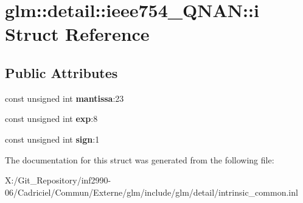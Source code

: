 \hypertarget{structglm_1_1detail_1_1ieee754___q_n_a_n_1_1i}{\section{glm\-:\-:detail\-:\-:ieee754\-\_\-\-Q\-N\-A\-N\-:\-:i Struct Reference}
\label{structglm_1_1detail_1_1ieee754___q_n_a_n_1_1i}
}
\subsection*{Public Attributes}
\begin{DoxyCompactItemize}
\item 
\hypertarget{structglm_1_1detail_1_1ieee754___q_n_a_n_1_1i_a1999926defcba631a716bee7d3044d0a}{const unsigned int {\bfseries mantissa}\-:23}\label{structglm_1_1detail_1_1ieee754___q_n_a_n_1_1i_a1999926defcba631a716bee7d3044d0a}

\item 
\hypertarget{structglm_1_1detail_1_1ieee754___q_n_a_n_1_1i_abc8cdb38ff3aa6a09214f7bfa32efac8}{const unsigned int {\bfseries exp}\-:8}\label{structglm_1_1detail_1_1ieee754___q_n_a_n_1_1i_abc8cdb38ff3aa6a09214f7bfa32efac8}

\item 
\hypertarget{structglm_1_1detail_1_1ieee754___q_n_a_n_1_1i_a5dd7e174864b6a8cd045563dde44f305}{const unsigned int {\bfseries sign}\-:1}\label{structglm_1_1detail_1_1ieee754___q_n_a_n_1_1i_a5dd7e174864b6a8cd045563dde44f305}

\end{DoxyCompactItemize}


The documentation for this struct was generated from the following file\-:\begin{DoxyCompactItemize}
\item 
X\-:/\-Git\-\_\-\-Repository/inf2990-\/06/\-Cadriciel/\-Commun/\-Externe/glm/include/glm/detail/intrinsic\-\_\-common.\-inl\end{DoxyCompactItemize}

